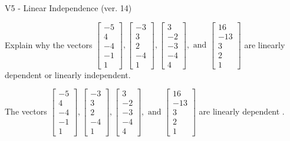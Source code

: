\begin{exercise}
  \begin{exerciseTitle}V5 - Linear Independence (ver. 14)\end{exerciseTitle}
  \begin{exerciseStatement}
    Explain why the vectors \(\left[\begin{array}{r}
-5 \\
4 \\
-4 \\
-1 \\
1
\end{array}\right] , \left[\begin{array}{r}
-3 \\
3 \\
2 \\
-4 \\
1
\end{array}\right] , \left[\begin{array}{r}
3 \\
-2 \\
-3 \\
-4 \\
4
\end{array}\right] , \text{ and } \left[\begin{array}{r}
16 \\
-13 \\
3 \\
2 \\
1
\end{array}\right]\) are linearly dependent or linearly independent.	


  \end{exerciseStatement}
  \begin{exerciseAnswer}
   The vectors \(\left[\begin{array}{r}
-5 \\
4 \\
-4 \\
-1 \\
1
\end{array}\right] , \left[\begin{array}{r}
-3 \\
3 \\
2 \\
-4 \\
1
\end{array}\right] , \left[\begin{array}{r}
3 \\
-2 \\
-3 \\
-4 \\
4
\end{array}\right] , \text{ and } \left[\begin{array}{r}
16 \\
-13 \\
3 \\
2 \\
1
\end{array}\right]\) are 
  	 linearly dependent  .
  


  \end{exerciseAnswer}
\end{exercise}